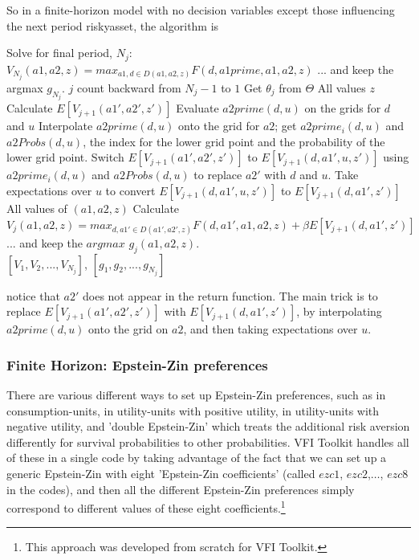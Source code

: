 So in a finite-horizon model with no decision variables except those influencing the next period riskyasset, the algorithm is
\begin{algorithmic}
 \State Solve for final period, $N_j$: $V_{N_j}(a1,a2,z)=max_{a1,d\in D(a1,a2,z)} F(d,a1prime,a1,a2,z)$
 \State ... and keep the argmax $g_{N_j}$.
 \For $j$ count backward from $N_j-1$ to $1$
   \State Get $\theta_j$ from $\Theta$
   \For All values $z$
    \State Calculate $E[V_{j+1}(a1',a2',z')]$
    \State Evaluate $a2prime(d,u)$ on the grids for $d$ and $u$
    \State Interpolate $a2prime(d,u)$ onto the grid for $a2$; get $a2prime_i(d,u)$ and $a2Probs(d,u)$, the index for the lower grid point and the probability of the lower grid point.
    \State Switch $E[V_{j+1}(a1',a2',z')]$ to $E[V_{j+1}(d,a1',u,z')]$ using $a2prime_i(d,u)$ and $a2Probs(d,u)$ to replace $a2'$ with $d$ and $u$.
    \State Take expectations over $u$ to convert $E[V_{j+1}(d,a1',u,z')]$ to $E[V_{j+1}(d,a1',z')]$
    \For All values of $(a1,a2,z)$
     \State Calculate $V_j(a1,a2,z)=max_{d,a1' \in D(a1',a2',z)} F(d,a1',a1,a2,z)+\beta E[V_{j+1}(d, a1',z')]$
     \State ... and keep the $argmax$ $g_j(a1,a2,z)$.
     \EndFor
   \EndFor
  \EndFor
   \\ \Return $[V_1,V_2,...,V_{N_j}]$, $[g_1,g_2,...,g_{N_j}]$
\end{algorithmic}
notice that $a2'$ does not appear in the return function. The main trick is to replace $E[V_{j+1}(a1',a2',z')]$ with $E[V_{j+1}(d,a1',z')]$, by interpolating $a2prime(d,u)$ onto the grid on $a2$, and then taking expectations over $u$.

\subsubsection{Finite Horizon: Epstein-Zin preferences}
There are various different ways to set up Epstein-Zin preferences, such as in consumption-units, in utility-units with positive utility, in utility-units with negative utility, and 'double Epstein-Zin' which treats the additional risk aversion differently for survival probabilities to other probabilities. VFI Toolkit handles all of these in a single code by taking advantage of the fact that we can set up a generic Epstein-Zin with eight 'Epstein-Zin coefficients' (called $ezc1$, $ezc2$,$\dots$, $ezc8$ in the codes), and then all the different Epstein-Zin preferences simply correspond to different values of these eight coefficients.\footnote{This approach was developed from scratch for VFI Toolkit.}

